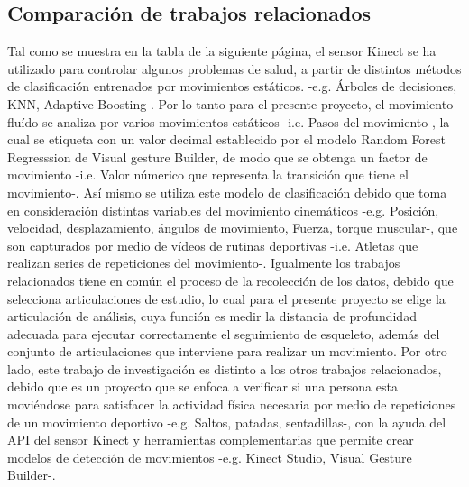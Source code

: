\subsection{Comparaci\'on de trabajos relacionados} \label{tr:10}
Tal como se muestra en la tabla de la siguiente p\'agina, el sensor Kinect se ha utilizado para controlar algunos problemas de salud, a partir de distintos m\'etodos de clasificaci\'on entrenados por  movimientos est\'aticos. -e.g. \'Arboles de decisiones, KNN, Adaptive Boosting-. Por lo tanto para el presente proyecto, el movimiento flu\'ido se analiza por varios movimientos est\'aticos -i.e. Pasos del movimiento-, la cual se etiqueta con un valor decimal establecido por el modelo Random Forest Regresssion de Visual gesture Builder, de modo que se obtenga un factor de movimiento -i.e. Valor n\'umerico que representa la transici\'on que tiene el movimiento-. As\'i mismo se utiliza este modelo de clasificaci\'on debido que toma en consideraci\'on distintas variables del movimiento cinem\'aticos -e.g. Posici\'on, velocidad, desplazamiento, \'angulos de movimiento, Fuerza, torque muscular-, que son capturados por medio de v\'ideos de rutinas deportivas -i.e. Atletas que realizan series de repeticiones del movimiento-.
\medbreak
Igualmente los trabajos relacionados tiene en com\'un el proceso de la recolecci\'on de los datos, debido que selecciona articulaciones de estudio, lo cual para el presente proyecto se elige la articulaci\'on de an\'alisis, cuya funci\'on es medir la distancia de profundidad adecuada para ejecutar correctamente el seguimiento de esqueleto, adem\'as del conjunto de articulaciones que interviene para realizar un movimiento.
\medbreak
Por otro lado, este trabajo de investigaci\'on es distinto a los otros trabajos relacionados, debido que es un proyecto que se enfoca a verificar si una persona esta movi\'endose para satisfacer la actividad f\'isica necesaria por medio de repeticiones de un movimiento deportivo -e.g. Saltos, patadas, sentadillas-, con la ayuda del API del sensor Kinect y herramientas complementarias que permite crear modelos de detecci\'on de movimientos -e.g. Kinect Studio, Visual Gesture Builder-.
